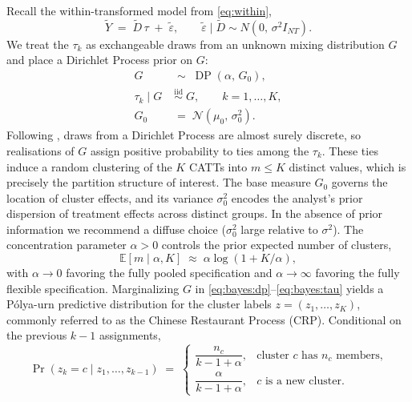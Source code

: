 \documentclass[margin=5in, 12pt]{article}
\newcommand{\1}{\mathbbm{1}}
\begin{document}
Recall the within-transformed model from \eqref{eq:within},
  \begin{equation}
    \tilde{Y} \;=\; \tilde{D}\,\tau \;+\; \tilde{\varepsilon}, \qquad \tilde{\varepsilon} \mid \tilde{D} \sim
  N\!\left(0,\,\sigma^{2} I_{NT}\right).
    \label{eq:bayes:lik}
  \end{equation}
We treat the $\tau_{k}$ as exchangeable draws from an unknown mixing distribution $G$ and place a Dirichlet Process prior on $G$:
  \begin{align}
    G &\;\sim\; \operatorname{DP}(\alpha,\, G_{0}), \label{eq:bayes:dp}\\
    \tau_{k} \mid G &\;\overset{\text{iid}}{\sim}\; G, \qquad k = 1,\dots,K, \label{eq:bayes:tau}\\
    G_{0} &\;=\; \mathcal{N}\!\left(\mu_{0},\,\sigma_{0}^{2}\right). \label{eq:bayes:base}
  \end{align}
  Following \citet{ferguson1973}, draws from a Dirichlet Process are almost surely discrete, so realisations of $G$ assign
  positive probability to ties among the $\tau_{k}$. These ties induce a random clustering of the $K$ CATTs into $m \le K$
  distinct values, which is precisely the partition structure of interest. The base measure $G_{0}$ governs the location of
  cluster effects, and its variance $\sigma_{0}^{2}$ encodes the analyst's prior dispersion of treatment effects across distinct
  groups. In the absence of prior information we recommend a diffuse choice ($\sigma_{0}^{2}$ large relative to $\sigma^{2}$). The concentration parameter $\alpha > 0$ controls the prior expected number of clusters,
  \begin{equation}
    \mathbb{E}[m \mid \alpha, K] \;\approx\; \alpha \log\!\left(1 + K/\alpha\right),
    \label{eq:bayes:mexp}
  \end{equation}
  with $\alpha \to 0$ favoring the fully pooled specification and $\alpha \to \infty$ favoring the fully flexible
  specification. Marginalizing $G$ in \eqref{eq:bayes:dp}--\eqref{eq:bayes:tau} yields a P\'olya-urn predictive distribution for the cluster
  labels $z = (z_{1},\dots,z_{K})$, commonly referred to as the Chinese Restaurant Process (CRP). Conditional on the previous
  $k-1$ assignments,
  \begin{equation}
    \Pr(z_{k} = c \mid z_{1},\dots,z_{k-1}) \;=\;
    \begin{cases}
      \dfrac{n_{c}}{k - 1 + \alpha}, & \text{cluster $c$ has $n_{c}$ members,}\\[6pt]
      \dfrac{\alpha}{k - 1 + \alpha}, & \text{$c$ is a new cluster.}
    \end{cases}
\label{eq:bayes:crp}
\end{equation}
\end{document}
